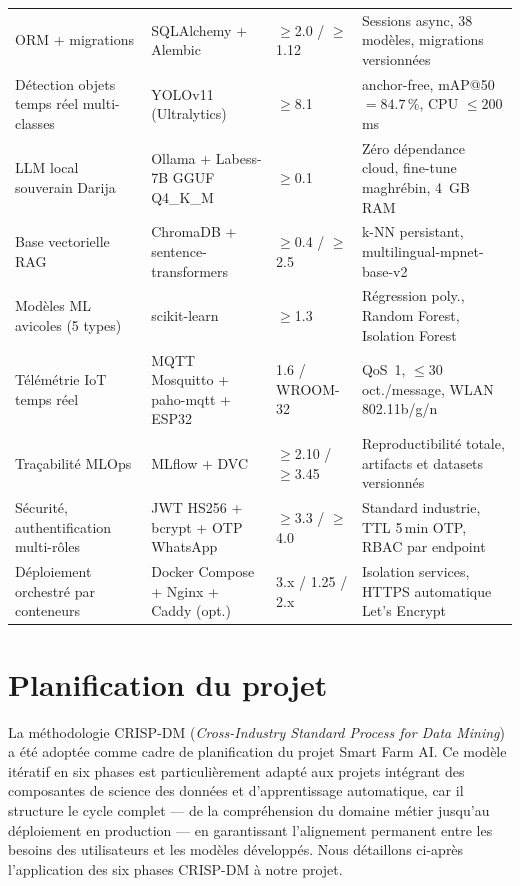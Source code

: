 \begin{table}[H]
{\begin{tabular}{llll}
\addlinespace
ORM + migrations
  & SQLAlchemy + Alembic
  & $\geq$2.0 / $\geq$1.12
  & Sessions async, 38 modèles, migrations versionnées \\
\addlinespace
Détection objets temps réel multi-classes
  & YOLOv11 (Ultralytics)
  & $\geq$8.1
  & anchor-free, mAP@50\,$=84.7\,\%$, CPU $\leq200$\,ms \\
\addlinespace
LLM local souverain Darija
  & Ollama + Labess-7B GGUF Q4\_K\_M
  & $\geq$0.1
  & Zéro dépendance cloud, fine-tune maghrébin, 4~GB RAM \\
\addlinespace
Base vectorielle RAG
  & ChromaDB + sentence-transformers
  & $\geq$0.4 / $\geq$2.5
  & k-NN persistant, multilingual-mpnet-base-v2 \\
\addlinespace
Modèles ML avicoles (5 types)
  & scikit-learn
  & $\geq$1.3
  & Régression poly., Random Forest, Isolation Forest \\
\addlinespace
Télémétrie IoT temps réel
  & MQTT Mosquitto + paho-mqtt + ESP32
  & 1.6 / WROOM-32
  & QoS~1, $\leq30$ oct./message, WLAN 802.11b/g/n \\
\addlinespace
Traçabilité MLOps
  & MLflow + DVC
  & $\geq$2.10 / $\geq$3.45
  & Reproductibilité totale, artifacts et datasets versionnés \\
\addlinespace
Sécurité, authentification multi-rôles
  & JWT HS256 + bcrypt + OTP WhatsApp
  & $\geq$3.3 / $\geq$4.0
  & Standard industrie, TTL 5\,min OTP, RBAC par endpoint \\
\addlinespace
Déploiement orchestré par conteneurs
  & Docker Compose + Nginx + Caddy (opt.)
  & 3.x / 1.25 / 2.x
  & Isolation services, HTTPS automatique Let's Encrypt \\
\bottomrule
\end{tabular}
}%
\end{table}

\section{Planification du projet}

La méthodologie CRISP-DM (\textit{Cross-Industry Standard Process for Data Mining})~%
\cite{wirth2000} a été adoptée comme cadre de planification du projet Smart Farm AI.
Ce modèle itératif en six phases est particulièrement adapté aux projets intégrant
des composantes de science des données et d'apprentissage automatique, car il structure
le cycle complet --- de la compréhension du domaine métier jusqu'au déploiement en
production --- en garantissant l'alignement permanent entre les besoins des
utilisateurs et les modèles développés.
Nous détaillons ci-après l'application des six phases CRISP-DM à notre projet.

